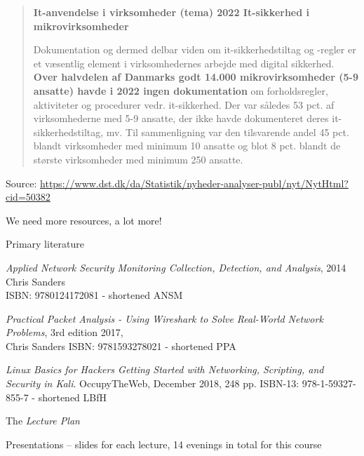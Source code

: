\documentclass[Screen16to9,17pt]{foils}
\begin{document}


\begin{quote}{\bf
It-anvendelse i virksomheder (tema) 2022 It-sikkerhed i mikrovirksomheder}

Dokumentation og dermed delbar viden om it-sikkerhedstiltag og -regler er et væsentlig element i virksomhedernes arbejde med digital sikkerhed. {\bf Over halvdelen af Danmarks godt 14.000 mikrovirksomheder (5-9 ansatte) havde i 2022 ingen dokumentation} om forholdsregler, aktiviteter og procedurer vedr. it-sikkerhed. Der var således 53 pct. af virksomhederne med 5-9 ansatte, der ikke havde dokumenteret deres it-sikkerhedstiltag, mv. Til sammenligning var den tilsvarende andel 45 pct. blandt virksomheder med minimum 10 ansatte og blot 8 pct. blandt de største virksomheder med minimum 250 ansatte.
\end{quote}
Source: \url{https://www.dst.dk/da/Statistik/nyheder-analyser-publ/nyt/NytHtml?cid=50382}

\begin{list2}
\item We need more resources, a lot more!
\end{list2}


\myquestionspage




Primary literature
\begin{list2}
\item \emph{Applied Network Security Monitoring Collection, Detection, and Analysis}, 2014 Chris Sanders \\
ISBN: 9780124172081 - shortened ANSM
\item \emph{Practical Packet Analysis - Using Wireshark to Solve Real-World Network Problems}, 3rd edition 2017, \\
Chris Sanders ISBN: 9781593278021 - shortened PPA
\item \emph{Linux Basics for Hackers Getting Started with Networking, Scripting, and Security in Kali}. OccupyTheWeb, December 2018, 248 pp. ISBN-13: 978-1-59327-855-7 - shortened LBfH
\item The \emph{Lecture Plan}\\
\item Presentations -- slides for each lecture, 14 evenings in total for this course\\{\footnotesize
{}}
\end{list2}
\end{document}
